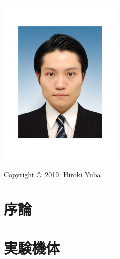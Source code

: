 \documentclass[12pt,epsf,here,fleqn]{jreport}
\begin{document}
\baselineskip=0.8cm%
\baselineskip=0.9cm%

\vspace*{13cm}
\begin{flushleft}
\hspace*{-9mm}
\includegraphics[height=8.3cm,width=6.0cm,clip]{figure_files/author.pdf}
\end{flushleft}
\vspace*{-5mm}
\hspace*{-9mm}
Copyright \copyright \, 2019, Hiroki Yuba


\thispagestyle{empty}%
\baselineskip=0.9cm%
\tableofcontents%
\newpage%
\baselineskip=0.7cm%
\setcounter{page}{1}%

\chapter{序論}
  
\chapter{実験機体}
  \label{}
  
\end{document}
